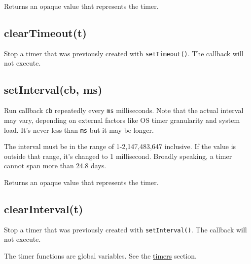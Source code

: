 Returns an opaque value that represents the timer.

\subsection{clearTimeout(t)}

Stop a timer that was previously created with \texttt{setTimeout()}. The
callback will not execute.

\subsection{setInterval(cb, ms)}

Run callback \texttt{cb} repeatedly every \texttt{ms} milliseconds. Note
that the actual interval may vary, depending on external factors like OS
timer granularity and system load. It's never less than \texttt{ms} but
it may be longer.

The interval must be in the range of 1-2,147,483,647 inclusive. If the
value is outside that range, it's changed to 1 millisecond. Broadly
speaking, a timer cannot span more than 24.8 days.

Returns an opaque value that represents the timer.

\subsection{clearInterval(t)}

Stop a timer that was previously created with \texttt{setInterval()}.
The callback will not execute.

The timer functions are global variables. See the
\href{timers.html}{timers} section.
